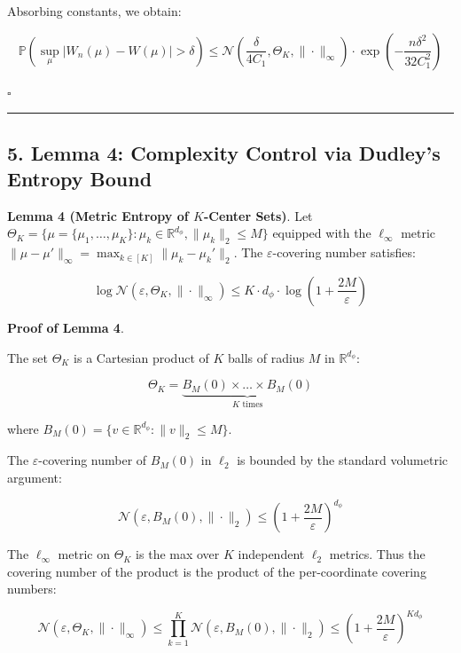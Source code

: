 \documentclass[
  12pt,
]{article}
\begin{document}
Absorbing constants, we obtain:

\[\mathbb{P}\left(\sup_{\mu} |W_n(\mu) - W(\mu)| > \delta\right) \leq \mathcal{N}\left(\frac{\delta}{4C_1}, \Theta_K, \|\cdot\|_\infty\right) \cdot \exp\left(-\frac{n\delta^2}{32 C_1^2}\right)\]

\(\square\)

\begin{center}\rule{0.5\linewidth}{0.5pt}\end{center}

\subsection{5. Lemma 4: Complexity Control via Dudley's Entropy
Bound}\label{lemma-4-complexity-control-via-dudleys-entropy-bound}

\textbf{Lemma 4 (Metric Entropy of \(K\)-Center Sets)}. Let
\(\Theta_K = \{\mu = \{\mu_1,\dots,\mu_K\} : \mu_k \in \mathbb{R}^{d_\phi}, \|\mu_k\|_2 \leq M\}\)
equipped with the \(\ell_\infty\) metric
\(\|\mu - \mu'\|_\infty = \max_{k \in [K]} \|\mu_k - \mu_k'\|_2\). The
\(\varepsilon\)-covering number satisfies:

\[\log \mathcal{N}(\varepsilon, \Theta_K, \|\cdot\|_\infty) \leq K \cdot d_\phi \cdot \log\left(1 + \frac{2M}{\varepsilon}\right)\]

\textbf{Proof of Lemma 4}.

The set \(\Theta_K\) is a Cartesian product of \(K\) balls of radius
\(M\) in \(\mathbb{R}^{d_\phi}\):

\[\Theta_K = \underbrace{B_M(0) \times \dots \times B_M(0)}_{K \text{ times}}\]

where \(B_M(0) = \{v \in \mathbb{R}^{d_\phi} : \|v\|_2 \leq M\}\).

The \(\varepsilon\)-covering number of \(B_M(0)\) in \(\ell_2\) is
bounded by the standard volumetric argument:

\[\mathcal{N}\left(\varepsilon, B_M(0), \|\cdot\|_2\right) \leq \left(1 + \frac{2M}{\varepsilon}\right)^{d_\phi}\]

The \(\ell_\infty\) metric on \(\Theta_K\) is the max over \(K\)
independent \(\ell_2\) metrics. Thus the covering number of the product
is the product of the per-coordinate covering numbers:

\[\mathcal{N}\left(\varepsilon, \Theta_K, \|\cdot\|_\infty\right) \leq \prod_{k=1}^K \mathcal{N}\left(\varepsilon, B_M(0), \|\cdot\|_2\right) \leq \left(1 + \frac{2M}{\varepsilon}\right)^{K d_\phi}\]
\end{document}
